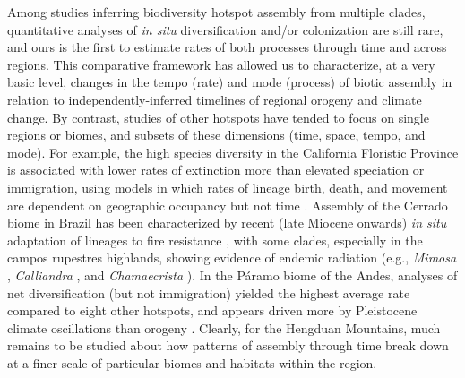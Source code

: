 \documentclass[9pt,twocolumn,twoside,lineno]{pnas-new}
\begin{document}



Among studies inferring biodiversity hotspot assembly from multiple
clades, quantitative analyses of \textit{in situ} diversification
and/or colonization are still rare, and ours is the first to estimate
rates of both processes through time and across regions. This
comparative framework has allowed us to characterize, at a very basic
level, changes in the tempo (rate) and mode (process) of biotic
assembly in relation to independently-inferred timelines of regional
orogeny and climate change. By contrast, studies of other hotspots
have tended to focus on single regions or biomes, and subsets of these
dimensions (time, space, tempo, and mode). For example, the high
species diversity in the California Floristic Province is associated
with lower rates of extinction more than elevated speciation or
immigration, using models in which rates of lineage birth, death, and
movement are dependent on geographic occupancy but not time
\citep{lancaster2013}. Assembly of the Cerrado biome in Brazil has
been characterized by recent (late Miocene onwards) \textit{in situ}
adaptation of lineages to fire resistance \citep{simon2009}, with some
clades, especially in the campos rupestres highlands, showing evidence
of endemic radiation (e.g., \textit{Mimosa}
\citep{koenen2013,simon2009}, \textit{Calliandra} \citep{souza2013},
and \textit{Chamaecrista} \citep{rando2015}). In the Páramo biome of
the Andes, analyses of net diversification (but not immigration)
yielded the highest average rate compared to eight other hotspots, and
appears driven more by Pleistocene climate oscillations than orogeny
\citep{Madrinan2013}. Clearly, for the Hengduan Mountains, much
remains to be studied about how patterns of assembly through time
break down at a finer scale of particular biomes and habitats within
the region.
\end{document}
